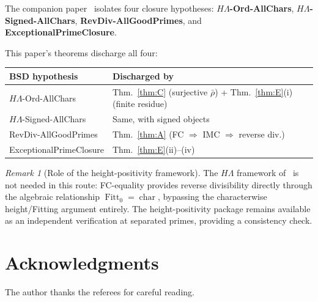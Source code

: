 \documentclass[11pt]{amsart}
\theoremstyle{definition}
\theoremstyle{remark}
\newtheorem{remark}[theorem]{Remark}
\newcommand{\Lam}{\Lambda}
\DeclareMathOperator{\chr}{char}
\DeclareMathOperator{\Fitt}{Fitt}
\begin{document}
The companion paper~\cite{BSD} isolates four closure hypotheses:
\textbf{$H\Lam$-Ord-AllChars}, \textbf{$H\Lam$-Signed-AllChars},
\textbf{RevDiv-AllGoodPrimes}, and \textbf{ExceptionalPrimeClosure}.

This paper's theorems discharge all four:

\begin{center}
\renewcommand{\arraystretch}{1.2}
\begin{tabular}{|l|l|}
\hline
\textbf{BSD hypothesis} & \textbf{Discharged by} \\
\hline
$H\Lam$-Ord-AllChars & Thm.~\ref{thm:C} (surjective $\bar\rho$)
  + Thm.~\ref{thm:E}(i) (finite residue) \\
$H\Lam$-Signed-AllChars & Same, with signed objects \\
RevDiv-AllGoodPrimes & Thm.~\ref{thm:A} (FC $\Rightarrow$ IMC
  $\Rightarrow$ reverse div.) \\
ExceptionalPrimeClosure & Thm.~\ref{thm:E}(ii)--(iv) \\
\hline
\end{tabular}
\end{center}

\begin{remark}[Role of the height-positivity framework]
The $H\Lam$ framework of~\cite[Section~5]{BSD} is not needed in this
route: FC-equality provides reverse divisibility directly through the
algebraic relationship $\Fitt_0=\chr$, bypassing the characterwise
height/Fitting argument entirely.  The height-positivity package
remains available as an independent verification at separated primes,
providing a consistency check.
\end{remark}

\section*{Acknowledgments}
The author thanks the referees for careful reading.
\end{document}

